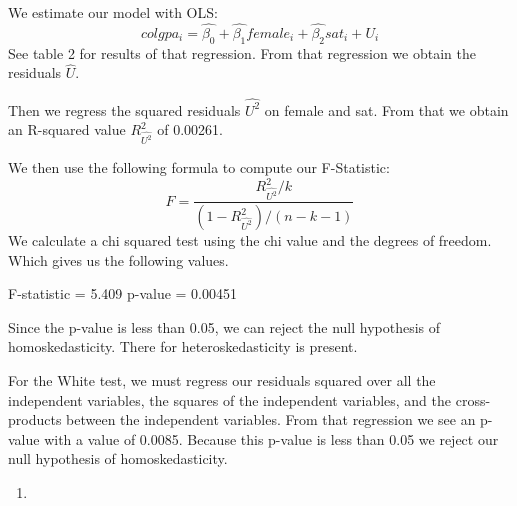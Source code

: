 \documentclass[
  12pt,
  landscape]{article}
\begin{document}
We estimate our model with OLS: \[
colgpa_i = \hat{\beta_0} + \hat{\beta_1}female_i + \hat{\beta_2}sat_i+ U_i
\] See table 2 for results of that regression. From that regression we
obtain the residuals \(\hat{U}\).

Then we regress the squared residuals \(\hat{U^2}\) on female and sat.
From that we obtain an R-squared value \(R^2_{\hat{U^2}}\) of 0.00261.

We then use the following formula to compute our F-Statistic: \[
F = \frac{R^2_{\hat{U^2}}/k}{(1-R^2_{\hat{U^2}})/(n-k-1)}
\] We calculate a chi squared test using the chi value and the degrees
of freedom. Which gives us the following values.

F-statistic = 5.409 p-value = 0.00451

Since the p-value is less than 0.05, we can reject the null hypothesis
of homoskedasticity. There for heteroskedasticity is present.

For the White test, we must regress our residuals squared over all the
independent variables, the squares of the independent variables, and the
cross-products between the independent variables. From that regression
we see an p-value with a value of 0.0085. Because this p-value is less
than 0.05 we reject our null hypothesis of homoskedasticity.

\begin{enumerate}
\def\labelenumi{(\alph{enumi})}
\setcounter{enumi}{4}
\item
\end{enumerate}
\end{document}
